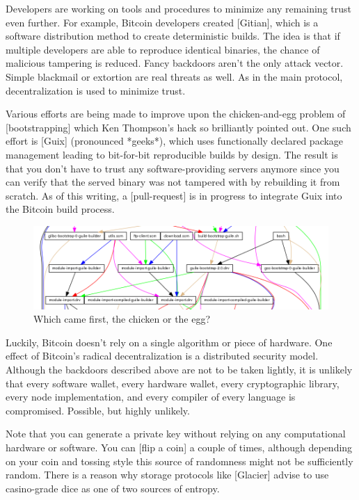 Developers are working on tools and procedures to minimize any remaining
trust even further. For example, Bitcoin developers created [Gitian],
which is a software distribution method to create deterministic builds.
The idea is that if multiple developers are able to reproduce identical
binaries, the chance of malicious tampering is reduced. Fancy backdoors
aren't the only attack vector. Simple blackmail or extortion are real
threats as well. As in the main protocol, decentralization is used to
minimize trust.

Various efforts are being made to improve upon the chicken-and-egg
problem of [bootstrapping] which Ken Thompson's hack so brilliantly
pointed out. One such effort is [Guix] (pronounced *geeks*), which uses
functionally declared package management leading to bit-for-bit
reproducible builds by design. The result is that you don't have to
trust any software-providing servers anymore since you can verify that
the served binary was not tampered with by rebuilding it from scratch.
As of this writing, a [pull-request] is in progress to integrate Guix
into the Bitcoin build process.

\begin{figure}
  \includegraphics{assets/images/guix-bootstrap-dependencies.png}
  \caption{Which came first, the chicken or the egg?}
  \label{fig:guix-bootstrap-dependencies}
\end{figure}

Luckily, Bitcoin doesn't rely on a single algorithm or piece of
hardware. One effect of Bitcoin's radical decentralization is a
distributed security model. Although the backdoors described above are
not to be taken lightly, it is unlikely that every software wallet,
every hardware wallet, every cryptographic library, every node
implementation, and every compiler of every language is compromised.
Possible, but highly unlikely.

Note that you can generate a private key without relying on any
computational hardware or software. You can [flip a coin] a couple of
times, although depending on your coin and tossing style this source of
randomness might not be sufficiently random. There is a reason why
storage protocols like [Glacier] advise to use casino-grade dice as one
of two sources of entropy.

